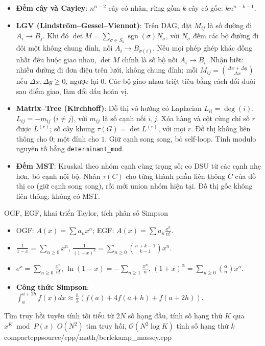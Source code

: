 \begin{itemize}
    \item \textbf{Đếm cây và Cayley}: $n^{n-2}$ cây có nhãn, rừng gồm $k$ cây có gốc: $k n^{n-k-1}$.
    \item \textbf{LGV (Lindstr\"om--Gessel--Viennot)}: Trên DAG, đặt $M_{ij}$ là số đường đi $A_i\to B_j$. Khi đó $\det M=\sum_{\sigma\in S_k}\operatorname{sgn}(\sigma)N_\sigma$, với $N_\sigma$ đếm các bộ đường đi đôi một không chung đỉnh, nối $A_i\to B_{\sigma(i)}$. Nếu mọi phép ghép khác đồng nhất đều buộc giao nhau, $\det M$ chính là số bộ nối $A_i\to B_i$. Nhận biết: nhiều đường đi đơn điệu trên lưới, không chung đỉnh; mỗi $M_{ij}=\binom{\Delta x+\Delta y}{\Delta x}$ nếu $\Delta x,\Delta y\ge0$, ngược lại $0$. Các bộ giao nhau triệt tiêu bằng cách đổi đuôi sau điểm giao, làm đổi dấu hoán vị.
    \item \textbf{Matrix--Tree (Kirchhoff)}: Đồ thị vô hướng có Laplacian $L_{ii}=\deg(i)$, $L_{ij}=-m_{ij}$ ($i\ne j$), với $m_{ij}$ là số cạnh nối $i,j$. Xóa hàng và cột cùng chỉ số $r$ được $L^{(r)}$; số cây khung $\tau(G)=\det L^{(r)}$, với mọi $r$. Đồ thị không liên thông cho $0$; một đỉnh cho $1$. Giữ cạnh song song, bỏ self-loop. Tính modulo nguyên tố bằng \texttt{determinant\_mod}.
    \item \textbf{Đếm MST}: Kruskal theo nhóm cạnh cùng trọng số; co DSU từ các cạnh nhẹ hơn, bỏ cạnh nội bộ. Nhân $\tau(C)$ cho từng thành phần liên thông $C$ của đồ thị co (giữ cạnh song song), rồi mới union nhóm hiện tại. Đồ thị gốc không liên thông: không có MST.
\end{itemize}

{OGF, EGF, khai triển Taylor, tích phân số Simpson}
{}
{}{}

\begin{itemize}
    \item OGF: $A(x) = \sum a_n x^n$; EGF: $A(x) = \sum a_n \frac{x^n}{n!}$.
    \item $\frac{1}{1-x} = \sum_{n \ge 0} x^n$, $\frac{1}{(1-x)^k} = \sum_{n \ge 0} \binom{n+k-1}{k-1} x^n$.
    \item $e^x = \sum_{n \ge 0} \frac{x^n}{n!}$, $\ln(1 - x) = -\sum_{n \ge 1} \frac{x^n}{n}$, $(1+x)^\alpha = \sum_{n \ge 0} \binom{\alpha}{n} x^n$.
    \item \textbf{Công thức Simpson}: $\int_a^{a+2h} f(x)dx \approx \frac{h}{3}(f(a) + 4f(a+h) + f(a + 2h))$.
\end{itemize}

{Tìm truy hồi tuyến tính tối tiểu từ $2N$ số hạng đầu, tính số hạng thứ $K$ qua $x^K\bmod P(x)$}
{${O}(N^2)$ tìm truy hồi, $\mathcal{O}(N^2 \log K)$ tính số hạng thứ $k$}
{compactcpp}{source/cpp/math/berlekamp_massey.cpp}

